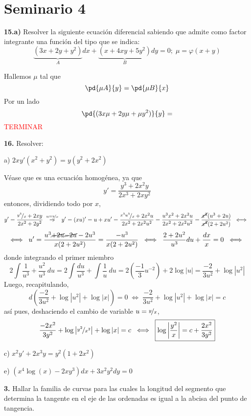 \section{Seminario 4}
\begin{ejer}
    \textbf{15.a)}  Resolver la siguiente ecuación diferencial sabiendo que admite como factor integrante una función del tipo que se indica:
    $$\underbrace{(3x+2y+y^2)}_A dx+\underbrace{(x+4xy+5y^2)}_B dy=0; \; \mu = \varphi(x+y)$$
\end{ejer}
\begin{sol}
    Hallemos $\mu$ tal que 
    $$\pd{\mu A}{y}=\pd{\mu B}{x}$$
    Por un lado
    $$\pd{(3x\mu+2y\mu+\mu y^2)}{y}=$$
    \textcolor{red}{TERMINAR}
\end{sol}
\begin{ejer}
    \textbf{16.} Resolver:
    
    a) $2xy'(x^2+y^2)=y(y^2+2x^2)$
    \begin{sol}
        Véase que es una ecuación homogénea, ya que 
        $$y'=\dfrac{y^3+2x^2y}{2x^3+2xy^2}$$
        entonces, dividiendo todo por $x$,
        $$y'=\dfrac{\nicefrac{y^3}{x}+2xy}{2x^2+2y^2} \; \overset{u=\nicefrac{y}{x}}{\Rightarrow} \; y'=(xu)'=u+xu'=\dfrac{\nicefrac{x^3u^3}{x}+2x^2u}{2x^2+2x^2u^2}=\dfrac{u^3x^2+2x^2u}{2x^2+2x^2u^2}=\dfrac{\cancel{x^2}(u^3+2u)}{\cancel{x^2}(2+2u^2)} \; \iff \;$$
        $$\iff \; u'=\dfrac{u^3\cancel{+2u}\cancel{-2u}-2u^3}{x(2+2u^2)}=\dfrac{-u^3}{x(2+2u^2)} \; \iff \; \dfrac{2+2u^2}{u^3} du + \dfrac{dx}{x}=0 \; \iff \;$$
        donde integrando el primer miembro
        $$2\int \dfrac{1}{u^3} + \dfrac{u^2}{u^3} \: du = 2 \int \dfrac{du}{u^3} + \int \dfrac{1}{u} \: du=2\left(\dfrac{-1}{3} u^{-2}\right)+2\log|u|=\dfrac{-2}{3u^2} +\log|u^2|$$
        Luego, recapitulando, 
        $$d\left(\dfrac{-2}{3u^2} +\log|u^2|+ \log|x| \right)=0 \; \iff \; \dfrac{-2}{3u^2} +\log|u^2|+ \log|x|=c $$
        así pues, deshaciendo el cambio de variable $u=\nicefrac{y}{x}$, 
        $$\dfrac{-2x^2}{3y^2} +\log\left|\nicefrac{y^2}{x^2}\right|+ \log|x|=c \; \iff \; \boxed{\log\left|\frac{y^2}{x}\right|=c+\dfrac{2x^2}{3y^2}} $$
    \end{sol}

    c) $x^2y'+2x^3y=y^2(1+2x^2)$

    e) $(x^4 \log (x)-2xy^3)dx+3x^2y^2dy=0$
    
\end{ejer}
\begin{ejer} \textbf{3.}
    Hallar la familia de curvas para las cuales la longitud del segmento que determina la tangente en el eje de las ordenadas es igual a la abcisa del punto de tangencia.
\end{ejer}
